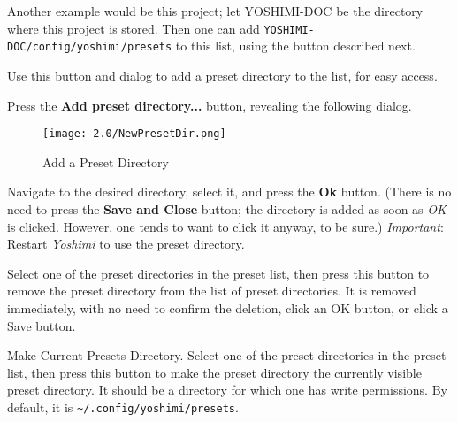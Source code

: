    Another example would be this project; let YOSHIMI-DOC be the directory
   where this project is stored.  Then one can add
   \texttt{YOSHIMI-DOC/config/yoshimi/presets} to this list, using the
   button described next.

   Use this button and dialog to add a preset directory to the list, for
   easy access.

   Press the \textbf{Add preset directory...} button, revealing the
   following dialog.

\begin{figure}[H]
   \centering
   \texttt{[image: 2.0/NewPresetDir.png]}
   \caption[Add Preset Directory]{Add a Preset Directory}
   \label{fig:presets_add_a_preset_directory}
\end{figure}

   Navigate to the desired directory, select it, and press the \textbf{Ok}
   button.  (There is no need to press the \textbf{Save and Close} button;
   the directory is added as soon as \textsl{OK} is clicked.  However, one
   tends to want to click it anyway, to be sure.)
   \textsl{Important}:  Restart \textsl{Yoshimi} to use the preset directory.

   Select one of the preset directories in the preset list, then press this
   button to remove the preset directory from the list of preset
   directories.  It is removed immediately, with no need to confirm the
   deletion, click an OK button, or click a Save button.

   Make Current Presets Directory.
   Select one of the preset directories in the preset list, then press this
   button to make the preset directory the currently visible preset directory.
   It should be a directory for which one has write permissions.
   By default, it is \texttt{\textasciitilde/.config/yoshimi/presets}.
\iffalse
\subsection{Menu / Scales}
\label{subsec:menu_scales}

   \textsl{Yoshimi} is a microtonal synthesizer, and is capable of a wide
   range of microtonal scales.  Improvement to its features and the accuracy of
   the scales have been made in the 1.5.0 series of \textsl{Yoshimi}.
   Scales are discussed in detail in
   \sectionref{sec:Scales}.
\fi
